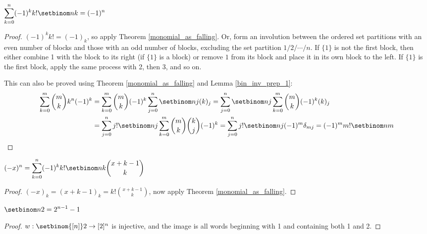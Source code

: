 \documentclass[a4paper]{article}
\begin{document}
\begin{theorem}
$\displaystyle\sum_{k=0}^n(-1)^kk!\setbinom nk=(-1)^n$

\begin{hl}
\begin{proof}
$(-1)^kk!=(-1)_k$, so apply Theorem \ref{monomial_as_falling}. Or, form an involution between the ordered set partitions with an even number of blocks and those with an odd number of blocks, excluding the set partition $1/2/\cdots/n$. If $\{1\}$ is not the first block, then either combine 1 with the block to its right (if $\{1\}$ is a block) or remove $1$ from its block and place it in its own block to the left. If $\{1\}$ is the first block, apply the same process with 2, then 3, and so on.

\medskip

This can also be proved using Theorem \ref{monomial_as_falling} and Lemma \ref{bin_inv_prep_1}:
\begin{align*}
\sum_{k=0}^m\binom mkk^n(-1)^k
&= \sum_{k=0}^m\binom mk(-1)^k\sum_{j=0}^n\setbinom nj(k)_j
= \sum_{j=0}^n\setbinom nj\sum_{k=0}^m\binom mk(-1)^k(k)_j\\
&= \sum_{j=0}^nj!\setbinom nj\sum_{k=0}^m\binom mk\binom kj(-1)^k
= \sum_{j=0}^nj!\setbinom nj(-1)^m\delta_{mj}
= (-1)^mm!\setbinom nm\qedhere
\end{align*}
\end{proof}
\end{hl}
\end{theorem}

\begin{theorem}
$\displaystyle(-x)^n=\sum_{k=0}^n(-1)^kk!\setbinom nk\binom{x+k-1}k$

\begin{hl}
\begin{proof}
$(-x)_k=(x+k-1)_k=k!\binom{x+k-1}k$, now apply Theorem \ref{monomial_as_falling}.
\end{proof}
\end{hl}
\end{theorem}

\begin{theorem}
$\displaystyle\setbinom n2=2^{n-1}-1$

\begin{hl}
\begin{proof}
$w:\setbinom{[n]}2\rightarrow[2]^n$ is injective, and the image is all words beginning with 1 and containing both 1 and 2.
\end{proof}
\end{hl}
\end{theorem}
\end{document}

